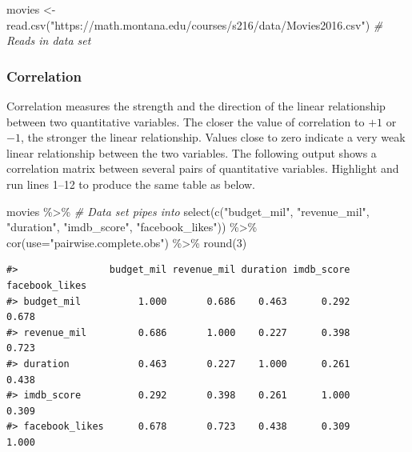 \documentclass[
]{report}
\newenvironment{Shaded}{\begin{snugshade}}{\end{snugshade}}
\newcommand{\AttributeTok}[1]{\textcolor[rgb]{0.77,0.63,0.00}{#1}}
\newcommand{\CommentTok}[1]{\textcolor[rgb]{0.56,0.35,0.01}{\textit{#1}}}
\newcommand{\DecValTok}[1]{\textcolor[rgb]{0.00,0.00,0.81}{#1}}
\newcommand{\FunctionTok}[1]{\textcolor[rgb]{0.00,0.00,0.00}{#1}}
\newcommand{\NormalTok}[1]{#1}
\newcommand{\OtherTok}[1]{\textcolor[rgb]{0.56,0.35,0.01}{#1}}
\newcommand{\SpecialCharTok}[1]{\textcolor[rgb]{0.00,0.00,0.00}{#1}}
\newcommand{\StringTok}[1]{\textcolor[rgb]{0.31,0.60,0.02}{#1}}
\begin{document}
\begin{Shaded}
\begin{Highlighting}[]
\NormalTok{movies }\OtherTok{\textless{}{-}} \FunctionTok{read.csv}\NormalTok{(}\StringTok{"https://math.montana.edu/courses/s216/data/Movies2016.csv"}\NormalTok{) }\CommentTok{\# Reads in data set}
\end{Highlighting}
\end{Shaded}

\newpage

\hypertarget{correlation}{%
\subsubsection*{Correlation}\label{correlation}}

Correlation measures the strength and the direction of the linear relationship between two quantitative variables. The closer the value of correlation to \(+1\) or \(-1\), the stronger the linear relationship. Values close to zero indicate a very weak linear relationship between the two variables. The following output shows a correlation matrix between several pairs of quantitative variables. Highlight and run lines 1--12 to produce the same table as below.

\begin{Shaded}
\begin{Highlighting}[]
\NormalTok{movies }\SpecialCharTok{\%\textgreater{}\%}  \CommentTok{\# Data set pipes into}
  \FunctionTok{select}\NormalTok{(}\FunctionTok{c}\NormalTok{(}\StringTok{"budget\_mil"}\NormalTok{, }\StringTok{"revenue\_mil"}\NormalTok{, }
           \StringTok{"duration"}\NormalTok{, }\StringTok{"imdb\_score"}\NormalTok{, }
           \StringTok{"facebook\_likes"}\NormalTok{)) }\SpecialCharTok{\%\textgreater{}\%}
  \FunctionTok{cor}\NormalTok{(}\AttributeTok{use=}\StringTok{"pairwise.complete.obs"}\NormalTok{) }\SpecialCharTok{\%\textgreater{}\%}
  \FunctionTok{round}\NormalTok{(}\DecValTok{3}\NormalTok{)}
\end{Highlighting}
\end{Shaded}

\begin{verbatim}
#>                budget_mil revenue_mil duration imdb_score facebook_likes
#> budget_mil          1.000       0.686    0.463      0.292          0.678
#> revenue_mil         0.686       1.000    0.227      0.398          0.723
#> duration            0.463       0.227    1.000      0.261          0.438
#> imdb_score          0.292       0.398    0.261      1.000          0.309
#> facebook_likes      0.678       0.723    0.438      0.309          1.000
\end{verbatim}
\end{document}
